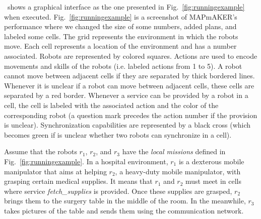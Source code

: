 \toolName\ shows a graphical interface as the one presented  in Fig.~\ref{fig:runningexample} when executed.
Fig.~\ref{fig:runningexample}  is a screenshot of  MAPmAKER's performance where we changed the size of some numbers, added  plans, and labeled some cells.
The grid represents the environment in which the robots move.
Each cell represents a location of the environment and has a number associated. %
Robots are represented by colored squares.
Actions are used to encode movements %
and skills of the robots (i.e. labeled actions from 1 to 5).
A robot  cannot move between adjacent cells if they are separated by thick bordered lines.
Whenever  it is unclear if a robot can move between adjacent cells, these cells are separated by a red border.
Whenever a service can be provided by a robot in a cell, the cell is labeled with the associated action and the color of the corresponding robot (a question mark precedes the action number if the provision is unclear).
Synchronization capabilities are represented by a black cross (which becomes green if is unclear whether two robots can synchronize in a cell).

Assume that the robots $r_1$, $r_2$, and $r_3$ have the \emph{local missions} defined in Fig.~\ref{fig:runningexample}.
In a  hospital environment, $r_1$ is a dexterous mobile manipulator that aims at helping $r_2$, a heavy-duty mobile manipulator, with grasping certain medical supplies.
It means that $r_1$ and $r_2$ must meet in cells where service \emph{fetch\_supplies} is provided.
Once these supplies are grasped, $r_2$ brings them to the surgery table in the middle of the room.
In the meanwhile, $r_3$ takes pictures of the table and sends them using the communication network.


